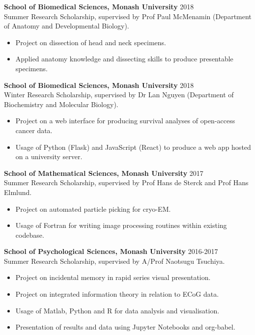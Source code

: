 \documentclass[margin]{res}
\begin{document}
\begin{resume}
{\bf School of Biomedical Sciences, Monash University} \hfill 2018\\
  Summer Research Scholarship, supervised by Prof Paul McMenamin (Department of
  Anatomy and Developmental Biology).
  \begin{itemize} \itemsep -2pt
      \item Project on dissection of head and neck specimens.
      \item Applied anatomy knowledge and dissecting skills to produce
        presentable specimens.
  \end{itemize}

  {\bf School of Biomedical Sciences, Monash University} \hfill 2018\\
  Winter Research Scholarship, supervised by Dr Lan Nguyen (Department of
  Biochemistry and Molecular Biology).
  \begin{itemize} \itemsep -2pt
      \item Project on a web interface for producing survival analyses of
        open-access cancer data.
      \item Usage of Python (Flask) and JavaScript (React) to produce a web app
        hosted on a university server.
  \end{itemize}

  {\bf School of Mathematical Sciences, Monash University} \hfill 2017\\
  Summer Research Scholarship, supervised by Prof Hans de Sterck and Prof Hans
  Elmlund.
  \begin{itemize} \itemsep -2pt
      \item Project on automated particle picking for cryo-EM.
      \item Usage of Fortran for writing image processing routines within
          existing codebase.
  \end{itemize}

  {\bf School of Psychological Sciences, Monash University} \hfill 2016-2017\\
  Summer Research Scholarship, supervised by A/Prof Naotsugu Tsuchiya.
  \begin{itemize} \itemsep -2pt
    \item Project on incidental memory in rapid series visual
      presentation.
    \item Project on integrated information theory in relation to ECoG
      data.
    \item Usage of Matlab, Python and R for data analysis and
      visualisation.
\item Presentation of results and data using Jupyter Notebooks and org-babel.
  \end{itemize}


\end{resume}
\end{document}

